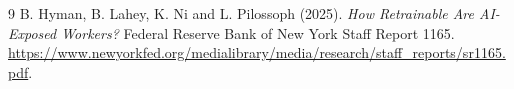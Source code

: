 \documentclass[11pt]{article}
\theoremstyle{remark}
\begin{document}
\begin{thebibliography}{9}
 B. Hyman, B. Lahey, K. Ni and L. Pilossoph (2025). \emph{How Retrainable Are AI-Exposed Workers?} Federal Reserve Bank of New York Staff Report 1165. \url{https://www.newyorkfed.org/medialibrary/media/research/staff_reports/sr1165.pdf}.
\end{thebibliography}
\end{document}
